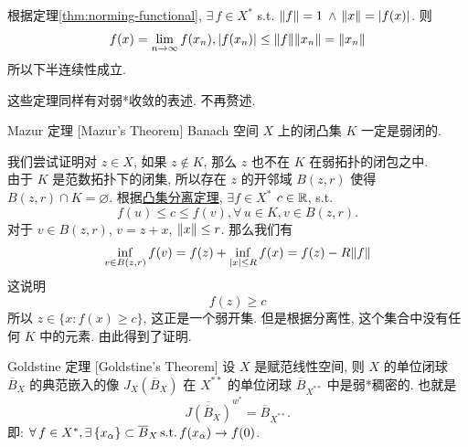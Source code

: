         \begin{prf}
            根据定理\ref{thm:norming-functional}, \(\exists\,f\in X^*\) s.t. \(\norm{f}=1\) \(\land\) \(\norm{x}=\abs{f(x)}\). 则
            \[f(x)=\lim_{n\to\infty}f(x_n), \abs{f(x_n)}\leq\norm{f}\norm{x_n}=\norm{x_n} \]
            所以下半连续性成立.
        \end{prf}

        \begin{rmk}
            [Dedicatia]
            这些定理同样有对弱*收敛的表述. 不再赘述.
        \end{rmk}

        \begin{thm}
            [mazur]
            {Mazur 定理}
            [Mazur's Theorem]
            Banach 空间 \(X\) 上的闭凸集 \(K\) 一定是弱闭的.
        \end{thm}

        \begin{prf}
            我们尝试证明对 \(z\in X\), 如果 \(z\notin K\), 那么 \(z\) 也不在 \(K\) 在弱拓扑的闭包之中. \\
            由于 \(K\) 是范数拓扑下的闭集, 所以存在 \(z\) 的开邻域 \(B(z,r)\) 使得 \(B(z,r)\cap K=\varnothing\). 根据\hyperref[thm:convex-set-separation]{凸集分离定理}, \(\exists f\in X^*\) \(c\in\operatorname{\mathbb{R}}\), s.t.
            \[f(u)\leq c\leq f(v), \forall\,u\in K, v\in B(z,r). \]
            对于 \(v\in B(z,r)\), \(v=z+x\), \(\norm{x}\leq r\). 那么我们有
            \[\inf_{v\in B(z,r)}f(v)=f(z)+\inf_{|x|\leq R}f(x)=f(z)-R\norm{f}\]
            这说明
            \[f(z)\geq c\]
            所以 \(z\in\{x: f(x)\geq c\}\), 这正是一个弱开集. 但是根据分离性, 这个集合中没有任何 \(K\) 中的元素. 由此得到了证明.
        \end{prf}

        \begin{thm}
            {Goldstine 定理}
            [Goldstine's Theorem]
            设 \(X\) 是赋范线性空间, 则 \(X\) 的单位闭球 \(\overline{B}_X\) 的典范嵌入的像 \(J_X(\overline{B}_X)\) 在 \(X^{**}\) 的单位闭球 \(\overline{B}_{X^{**}}\) 中是弱*稠密的. 也就是
            \[\overline{J(\overline{B}_{X})}^{w^*}=\overline{B}_{X^{**}}.\]
            即: \(\forall\,f\in X^*, \exists\,\{x_\alpha\}\subset\overline{B}_X\operatorname{\text{s.t.}} f(x_\alpha)\to f(0)\).
        \end{thm}

